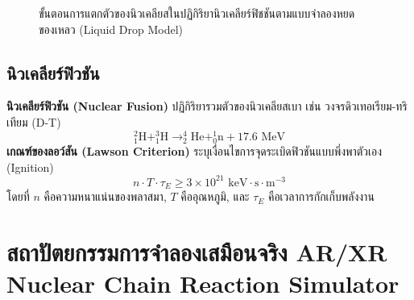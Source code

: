 \begin{figure}[H]
\caption{ขั้นตอนการแตกตัวของนิวเคลียสในปฏิกิริยานิวเคลียร์ฟิชชันตามแบบจำลองหยดของเหลว (Liquid Drop Model)}
\label{fig:fission_stages}
\end{figure}

\subsection{นิวเคลียร์ฟิวชัน}
\textbf{นิวเคลียร์ฟิวชัน (Nuclear Fusion)} ปฏิกิริยารวมตัวของนิวเคลียสเบา เช่น วงจรดิวเทอเรียม-ทริเทียม (D-T)
\begin{equation}
^2_1\text{H} + ^3_1\text{H} \to ^4_2\text{He} + ^1_0\text{n} + 17.6\text{ MeV}
\end{equation}
\textbf{เกณฑ์ของลอว์สัน (Lawson Criterion)} ระบุเงื่อนไขการจุดระเบิดฟิวชันแบบพึ่งพาตัวเอง (Ignition)
\begin{equation}
n \cdot T \cdot \tau_E \ge 3 \times 10^{21}\text{ keV}\cdot\text{s}\cdot\text{m}^{-3}
\end{equation}
โดยที่ $n$ คือความหนาแน่นของพลาสมา, $T$ คืออุณหภูมิ, และ $\tau_E$ คือเวลาการกักเก็บพลังงาน

\section{สถาปัตยกรรมการจำลองเสมือนจริง AR/XR Nuclear Chain Reaction Simulator}

